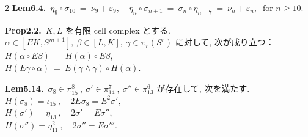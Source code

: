 \documentclass[10pt, leqno]{ltjsarticle}
\numberwithin{equation}{section}
\theoremstyle{plain}
\theoremstyle{definition}
\theoremstyle{remark}
\begin{document}
\begin{paracol}{2}
\noindent
\textbf{Lem6.4.}\
\(
\eta_9\circ \sigma_{10}\ =\ \overline\nu_9+\varepsilon_9,
\quad \eta_n\circ \sigma_{n+1}\ =\ 
\sigma_n \circ\eta_{n+7}\ =\
\overline\nu_n+\varepsilon_n,\ \text{ for } n\ge10.
\)

\noindent
\textbf{Prop2.2.}\
$K,L$ を有限 cell complex とする. \\
$\alpha\in[EK, S^{m+1}], \ \beta\in[L,K], \ \gamma\in\pi_r(S^r)$ 
に対して, 次が成り立つ：\\
\(
H(\alpha\circ E\beta)\ =\ H(\alpha)\circ E\beta,
\)\\
\(
H(E\gamma\circ\alpha)\ =\ E(\gamma\wedge\gamma)\circ H(\alpha).
\)

\noindent
\textbf{Lem5.14.}\
\(\sigma_{8}\in\pi^{8}_{15}\ , \ \sigma'\in\pi^{7}_{14}\ , \ \sigma''\in\pi^{6}_{13}\) 
が存在して, 次を満たす. \\
\(H(\sigma_{8})=\iota_{15} \ ,\quad 2E\sigma_{8}=E^{2}\sigma',\)\\
\(H(\sigma')=\eta_{13} \ ,\quad 2\sigma'=E\sigma'',\)\\
\(H(\sigma'')=\eta_{11}^2 \ ,\quad 2\sigma''=E\sigma''' .\)









\end{paracol}
\end{document}
